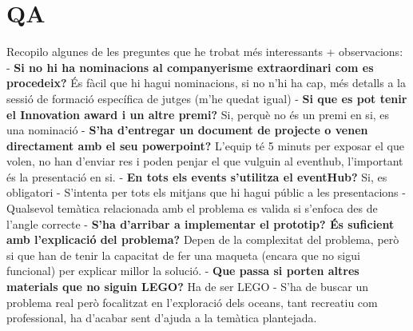 \documentclass{article}
\begin{document}
\section{QA}

Recopilo algunes de les preguntes que he trobat més interessants + observacions:
\hfill \break\hfill \break
- \textbf{Si no hi ha nominacions al companyerisme extraordinari com es procedeix?} És fàcil que hi hagui nominacions, si no n'hi ha cap, més detalls a la sessió de formació específica de jutges (m’he quedat igual)
\hfill \break\hfill \break
- \textbf{Si que es pot tenir el Innovation award i un altre premi?} Si, perquè no és un premi en si, es una nominació
\hfill \break\hfill \break
- \textbf{S’ha d’entregar un document de projecte o venen directament amb el seu powerpoint?} L’equip té 5 minuts per exposar el que volen, no han d’enviar res i poden penjar el que vulguin al eventhub, l'important és la presentació en si.
\hfill \break\hfill \break
- \textbf{En tots els events s’utilitza el eventHub?} Si, es obligatori
\hfill \break\hfill \break
- S’intenta per tots els mitjans que hi hagui públic a les presentacions
\hfill \break\hfill \break
- Qualsevol temàtica relacionada amb el problema es valida si s’enfoca des de l’angle correcte
\hfill \break\hfill \break
- \textbf{S’ha d’arribar a implementar el prototip? És suficient amb l’explicació del problema?} Depen de la complexitat del problema, però si que han de tenir la capacitat de fer una maqueta (encara que no sigui funcional) per explicar millor la solució.
\hfill \break\hfill \break
- \textbf{Que passa si porten altres materials que no siguin LEGO?} Ha de ser LEGO
\hfill \break\hfill \break
- S’ha de buscar un problema real però focalitzat en l’exploració dels oceans, tant recreatiu com professional, ha d’acabar sent d’ajuda a la temàtica plantejada.
\end{document}

